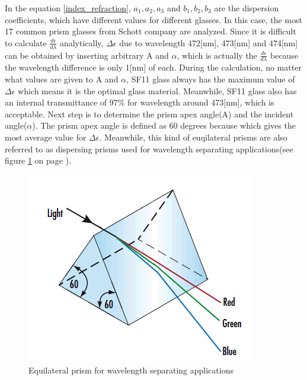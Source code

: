 In the equation \ref{index_refraction}, $a_{1}, a_{2}, a_{3}$ and $b_{1}, b_{2}, b_{3}$ are the dispersion coefficients, which have different values for different glasses. In this case, the most 17 common prism glasses from Schott\cite{prism_material}\cite{prism_book} company are analyzed. Since it is difficult to calculate $\frac{d\epsilon}{d\lambda}$ analytically, $\Delta\epsilon$ due to wavelength 472[nm], 473[nm] and 474[nm] can be obtained by inserting arbitrary A and $\alpha$, which is actually the $\frac{d\epsilon}{d\lambda}$ because the wavelength difference is only 1[nm] of each. During the calculation, no matter what values are given to A and $\alpha$, SF11 glass always has the maximum value of $\Delta\epsilon$ which means it is the optimal glass material. Meanwhile, SF11 glass also has an internal transmittance of 97\% for wavelength around 473[nm], which is acceptable. Next step is to determine the prism apex angle(A) and the incident angle($\alpha$). The prism apex angle is defined as 60 degrees because which gives the most average value for $\Delta\epsilon$. Meanwhile, this kind of euqilateral prisms are also referred to as dispersing prisms used for wavelength separating applications(see figure \ref{fig:prism_equilateral} on page \pageref{fig:prism_equilateral}). 

\begin{figure}[ht!]
\centering
\includegraphics[scale = 0.8]{chapters/img/prism_equilateral.png}
\caption{Equilateral prism for wavelength separating applications}
\label{fig:prism_equilateral}
\end{figure}

